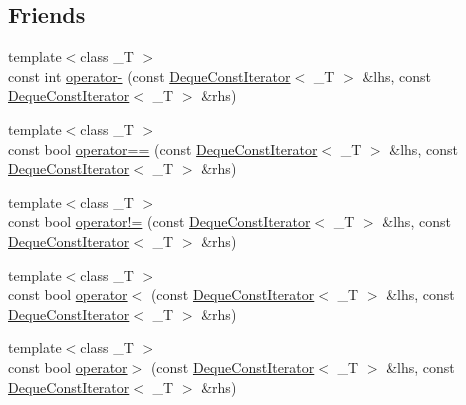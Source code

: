 \subsection*{Friends}
\begin{DoxyCompactItemize}
\item 
{\footnotesize template$<$class \+\_\+T $>$ }\\const int \hyperlink{classprism_1_1containers_1_1_deque_const_iterator_a5289e7bfe8fcb39d668aea5d8af9218f}{operator-\/} (const \hyperlink{classprism_1_1containers_1_1_deque_const_iterator}{Deque\+Const\+Iterator}$<$ \+\_\+T $>$ \&lhs, const \hyperlink{classprism_1_1containers_1_1_deque_const_iterator}{Deque\+Const\+Iterator}$<$ \+\_\+T $>$ \&rhs)
\item 
{\footnotesize template$<$class \+\_\+T $>$ }\\const bool \hyperlink{classprism_1_1containers_1_1_deque_const_iterator_ad768889898a243c4d1748b9e63cc5ef2}{operator==} (const \hyperlink{classprism_1_1containers_1_1_deque_const_iterator}{Deque\+Const\+Iterator}$<$ \+\_\+T $>$ \&lhs, const \hyperlink{classprism_1_1containers_1_1_deque_const_iterator}{Deque\+Const\+Iterator}$<$ \+\_\+T $>$ \&rhs)
\item 
{\footnotesize template$<$class \+\_\+T $>$ }\\const bool \hyperlink{classprism_1_1containers_1_1_deque_const_iterator_aead97b4b6008817cad96daee8e1bc065}{operator!=} (const \hyperlink{classprism_1_1containers_1_1_deque_const_iterator}{Deque\+Const\+Iterator}$<$ \+\_\+T $>$ \&lhs, const \hyperlink{classprism_1_1containers_1_1_deque_const_iterator}{Deque\+Const\+Iterator}$<$ \+\_\+T $>$ \&rhs)
\item 
{\footnotesize template$<$class \+\_\+T $>$ }\\const bool \hyperlink{classprism_1_1containers_1_1_deque_const_iterator_abc81021a112b29c4dd2cfffb921cb181}{operator$<$} (const \hyperlink{classprism_1_1containers_1_1_deque_const_iterator}{Deque\+Const\+Iterator}$<$ \+\_\+T $>$ \&lhs, const \hyperlink{classprism_1_1containers_1_1_deque_const_iterator}{Deque\+Const\+Iterator}$<$ \+\_\+T $>$ \&rhs)
\item 
{\footnotesize template$<$class \+\_\+T $>$ }\\const bool \hyperlink{classprism_1_1containers_1_1_deque_const_iterator_a02dbab4b40ce3cc5bc3f4ecc0272d222}{operator$>$} (const \hyperlink{classprism_1_1containers_1_1_deque_const_iterator}{Deque\+Const\+Iterator}$<$ \+\_\+T $>$ \&lhs, const \hyperlink{classprism_1_1containers_1_1_deque_const_iterator}{Deque\+Const\+Iterator}$<$ \+\_\+T $>$ \&rhs)

\end{DoxyCompactItemize}
